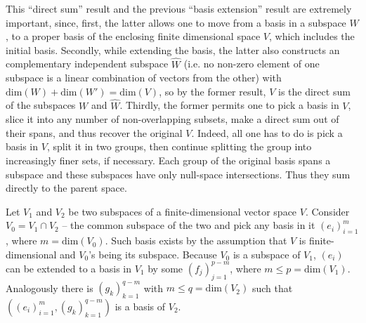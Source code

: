 \documentclass[a4paper]{article}
\newcommand{\brac}[1]{\ensuremath{\left( #1 \right)}}
\newcommand{\Dim}[1]{\ensuremath{\text{dim}\brac{ #1 }}}
\begin{document}
This ``direct sum'' result and the previous ``basis extension'' result are extremely important, since, first, the latter allows one to move from a basis in a subspace $W$, to a proper basis of the enclosing finite dimensional space $V$, which includes the initial basis. Secondly, while extending the basis, the latter also constructs an complementary independent subspace $\hat{W}$ (i.e. no non-zero element of one subspace is a linear combination of vectors from the other) with $\Dim{W}+\Dim{W'} = \Dim{V}$, so by the former result, $V$ is the direct sum of the subspaces $W$ and $\hat{W}$. Thirdly, the former permits one to pick a basis in $V$, slice it into any number of non-overlapping subsets, make a direct sum out of their spans, and thus recover the original $V$. Indeed, all one has to do is pick a basis in $V$, split it in two groups, then continue splitting the group into increasingly finer sets, if necessary. Each group of the original basis spans a subspace and these subspaces have only null-space intersections. Thus they sum directly to the parent space.

Let $V_1$ and $V_2$ be two subspaces of a finite-dimensional vector space $V$. Consider $V_0 = V_1 \cap V_2$ -- the common subspace of the two and pick any basis in it $\brac{e_i}_{i=1}^m$, where $m = \Dim{V_0}$. Such basis exists by the assumption that $V$ is finite-dimensional and $V_0$'s being its subspace. Because $V_0$ is a subspace of $V_1$, $\brac{e_i}$ can be extended to a basis in $V_1$ by some $\brac{f_j}_{j=1}^{p-m}$, where $m\leq p = \Dim{V_1}$. Analogously there is $\brac{g_k}_{k=1}^{q-m}$ with $m\leq q = \Dim{V_2}$ such that $\brac{\brac{e_i}_{i=1}^m, \brac{g_k}_{k=1}^{q-m}}$ is a basis of $V_2$.
\end{document}
